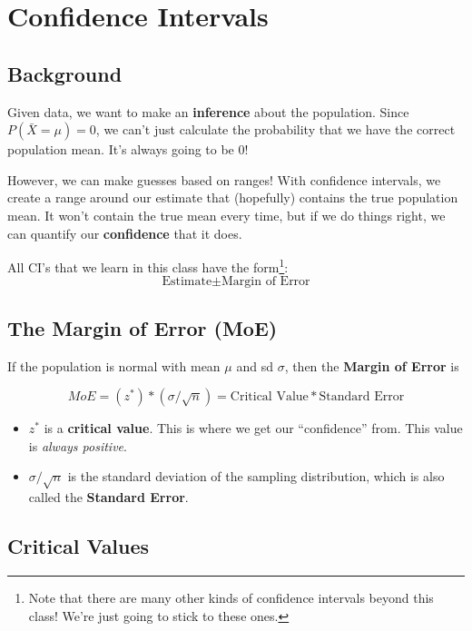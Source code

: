 \documentclass[
  letterpaper,
  DIV=11,
  numbers=noendperiod,
  oneside]{scrreprt}
\providecommand{\tightlist}{%
  \setlength{\itemsep}{0pt}\setlength{\parskip}{0pt}}\usepackage{longtable,booktabs,array}
\begin{document}
\hypertarget{confidence-intervals}{%
\section{Confidence Intervals}\label{confidence-intervals}}

\hypertarget{background}{%
\subsection{Background}\label{background}}

Given data, we want to make an \textbf{inference} about the population.
Since \(P(\bar X = \mu) = 0\), we can't just calculate the probability
that we have the correct population mean. It's always going to be 0!

However, we can make guesses based on ranges! With confidence intervals,
we create a range around our estimate that (hopefully) contains the true
population mean. It won't contain the true mean every time, but if we do
things right, we can quantify our \textbf{confidence} that it does.

All CI's that we learn in this class have the form\footnote{Note that
  there are many other kinds of confidence intervals beyond this class!
  We're just going to stick to these ones.}: \[
\text{Estimate} \pm \text{Margin of Error}
\]

\hypertarget{the-margin-of-error-moe}{%
\subsection{The Margin of Error (MoE)}\label{the-margin-of-error-moe}}

If the population is normal with mean \(\mu\) and sd \(\sigma\), then
the \textbf{Margin of Error} is

\[
MoE = (z^*)*(\sigma/\sqrt{n}) = \text{Critical Value}*\text{Standard Error}
\]

\begin{itemize}
\tightlist
\item
  \(z^*\) is a \textbf{critical value}. This is where we get our
  ``confidence'' from. This value is \emph{always positive}.
\item
  \(\sigma/\sqrt{n}\) is the standard deviation of the sampling
  distribution, which is also called the \textbf{Standard Error}.
\end{itemize}

\hypertarget{critical-values}{%
\subsection{Critical Values}\label{critical-values}}
\end{document}
